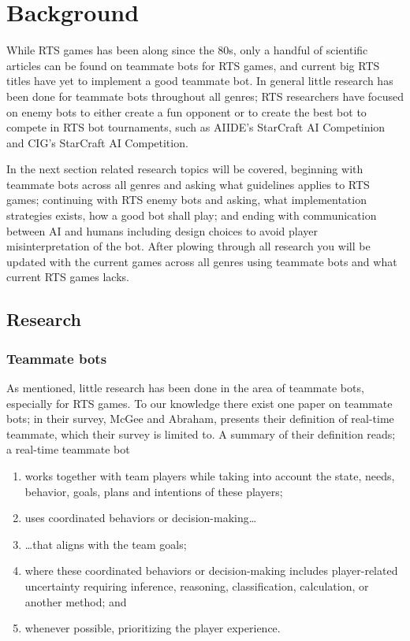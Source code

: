 \chapter{Background}
While RTS games has been along since the 80s\cite{adams06, rtsHistory}, only a handful of scientific articles can be found on teammate bots for RTS games, and current big RTS titles have yet to implement a good teammate bot. In general little research has been done for teammate bots throughout all genres; RTS researchers have focused on enemy bots to either create a fun opponent
or to create the best bot to compete in RTS bot tournaments, such as  AIIDE's StarCraft AI Competinion\cite{scaiide} and CIG's StarCraft AI Competition\cite{sccig}.

In the next section related research topics will be covered, beginning with teammate bots across all genres and asking what guidelines applies to RTS games; continuing with RTS enemy bots and asking, what implementation strategies exists, how a good bot shall play; and ending with communication between AI and humans including design choices to avoid player misinterpretation of the bot. After plowing through all research you will be updated with the current games across all genres using teammate bots and what current RTS games lacks.


\section{Research}

\subsection{Teammate bots}
As mentioned, little research has been done in the area of teammate bots, especially for RTS games. To our knowledge there exist one paper on teammate bots\cite{mcgee10}; in their survey, McGee and Abraham, presents their definition of real-time teammate, which their survey is limited to. A summary of their definition reads; a real-time teammate bot
\begin{enumerate}
	\item works together with team players while taking into account the state, needs, behavior, goals, plans and intentions of these players;
	\item uses coordinated behaviors or decision-making\ldots
	\item {\ldots}that aligns with the team goals;
	\item where these coordinated behaviors or decision-making includes player-related uncertainty requiring inference, reasoning, classification, calculation, or another method; and
	\item whenever possible, prioritizing the player experience.
\end{enumerate}

